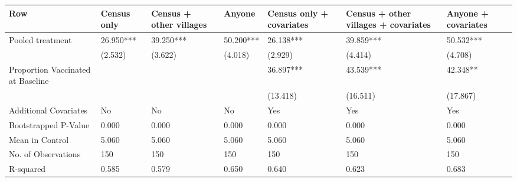 
\begin{tabular}{lllllll}
\toprule
Row & Census only & Census + other villages & Anyone & Census only + covariates & Census + other villages + covariates & Anyone + covariates\\
\midrule
Pooled treatment & 26.950*** & 39.250*** & 50.200*** & 26.138*** & 39.859*** & 50.532***\\
 & (2.532) & (3.622) & (4.018) & (2.929) & (4.414) & (4.708)\\
Proportion Vaccinated at Baseline &  &  &  & 36.897*** & 43.539*** & 42.348**\\
 &  &  &  & (13.418) & (16.511) & (17.867)\\
Additional Covariates & No & No & No & Yes & Yes & Yes\\
\addlinespace
Bootstrapped P-Value & 0.000 & 0.000 & 0.000 & 0.000 & 0.000 & 0.000\\
Mean in Control & 5.060 & 5.060 & 5.060 & 5.060 & 5.060 & 5.060\\
No. of Observations & 150 & 150 & 150 & 150 & 150 & 150\\
R-squared & 0.585 & 0.579 & 0.650 & 0.640 & 0.623 & 0.683\\
\bottomrule
\end{tabular}
